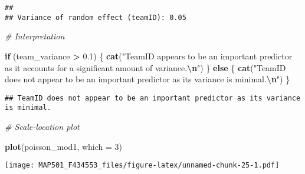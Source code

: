 \documentclass[
]{article}
\newenvironment{Shaded}{\begin{snugshade}}{\end{snugshade}}
\newcommand{\AttributeTok}[1]{\textcolor[rgb]{0.13,0.29,0.53}{#1}}
\newcommand{\CommentTok}[1]{\textcolor[rgb]{0.56,0.35,0.01}{\textit{#1}}}
\newcommand{\ControlFlowTok}[1]{\textcolor[rgb]{0.13,0.29,0.53}{\textbf{#1}}}
\newcommand{\DecValTok}[1]{\textcolor[rgb]{0.00,0.00,0.81}{#1}}
\newcommand{\FloatTok}[1]{\textcolor[rgb]{0.00,0.00,0.81}{#1}}
\newcommand{\FunctionTok}[1]{\textcolor[rgb]{0.13,0.29,0.53}{\textbf{#1}}}
\newcommand{\NormalTok}[1]{#1}
\newcommand{\SpecialCharTok}[1]{\textcolor[rgb]{0.81,0.36,0.00}{\textbf{#1}}}
\newcommand{\StringTok}[1]{\textcolor[rgb]{0.31,0.60,0.02}{#1}}
\begin{document}
\begin{verbatim}
## 
## Variance of random effect (teamID): 0.05
\end{verbatim}

\begin{Shaded}
\begin{Highlighting}[]
\CommentTok{\# Interpretation}

\ControlFlowTok{if}\NormalTok{ (team\_variance }\SpecialCharTok{\textgreater{}} \FloatTok{0.1}\NormalTok{) \{}
  \FunctionTok{cat}\NormalTok{(}\StringTok{"TeamID appears to be an important predictor as it accounts for a significant amount of variance.}\SpecialCharTok{\textbackslash{}n}\StringTok{"}\NormalTok{)}
\NormalTok{\} }\ControlFlowTok{else}\NormalTok{ \{}
  \FunctionTok{cat}\NormalTok{(}\StringTok{"TeamID does not appear to be an important predictor as its variance is minimal.}\SpecialCharTok{\textbackslash{}n}\StringTok{"}\NormalTok{)}
\NormalTok{\}}
\end{Highlighting}
\end{Shaded}

\begin{verbatim}
## TeamID does not appear to be an important predictor as its variance is minimal.
\end{verbatim}

\begin{Shaded}
\begin{Highlighting}[]
\CommentTok{\# Scale{-}location plot}

\FunctionTok{plot}\NormalTok{(poisson\_mod1, }\AttributeTok{which =} \DecValTok{3}\NormalTok{)}
\end{Highlighting}
\end{Shaded}

\texttt{[image: MAP501\_F434553\_files/figure-latex/unnamed-chunk-25-1.pdf]}
\end{document}
